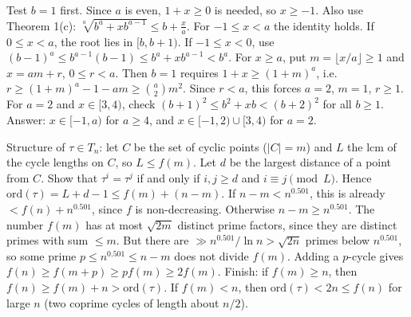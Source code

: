 \documentclass[11pt,a4paper]{article}
\begin{document}
 Test $b=1$ first. Since $a$ is even, $1+x\ge0$ is needed, so $x\ge-1$. Also use Theorem 1(c): $\sqrt[a]{b^a+xb^{a-1}}\le b+\frac xa$.
 For $-1\le x<a$ the identity holds. If $0\le x<a$, the root lies in $[b,b+1)$. If $-1\le x<0$, use $(b-1)^a\le b^{a-1}(b-1)\le b^a+xb^{a-1}<b^a$.
 For $x\ge a$, put $m=\lfloor x/a\rfloor\ge1$ and $x=am+r$, $0\le r<a$. Then $b=1$ requires $1+x\ge(1+m)^a$, i.e.\ $r\ge(1+m)^a-1-am\ge\binom a2m^2$. Since $r<a$, this forces $a=2$, $m=1$, $r\ge1$.
 For $a=2$ and $x\in[3,4)$, check $(b+1)^2\le b^2+xb<(b+2)^2$ for all $b\ge1$. Answer: $x\in[-1,a)$ for $a\ge4$, and $x\in[-1,2)\cup[3,4)$ for $a=2$.

 Structure of $\tau\in T_n$: let $C$ be the set of cyclic points ($|C|=m$) and $L$ the lcm of the cycle lengths on $C$, so $L\le f(m)$. Let $d$ be the largest distance of a point from $C$. Show that $\tau^i=\tau^j$ if and only if $i,j\ge d$ and $i\equiv j\pmod L$.
 Hence $\mathrm{ord}(\tau)=L+d-1\le f(m)+(n-m)$. If $n-m<n^{0.501}$, this is already $<f(n)+n^{0.501}$, since $f$ is non-decreasing.
 Otherwise $n-m\ge n^{0.501}$. The number $f(m)$ has at most $\sqrt{2m}$ distinct prime factors, since they are distinct primes with sum $\le m$. But there are $\gg n^{0.501}/\ln n>\sqrt{2n}$ primes below $n^{0.501}$, so some prime $p\le n^{0.501}\le n-m$ does not divide $f(m)$. Adding a $p$-cycle gives $f(n)\ge f(m+p)\ge pf(m)\ge2f(m)$.
 Finish: if $f(m)\ge n$, then $f(n)\ge f(m)+n>\mathrm{ord}(\tau)$. If $f(m)<n$, then $\mathrm{ord}(\tau)<2n\le f(n)$ for large $n$ (two coprime cycles of length about $n/2$).
\end{document}
